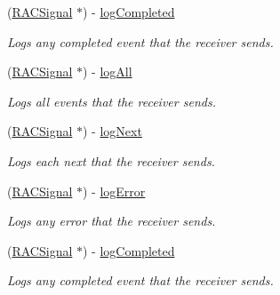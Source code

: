 \begin{DoxyCompactItemize}
(\mbox{\hyperlink{interface_r_a_c_signal}{R\+A\+C\+Signal}} $\ast$) -\/ \mbox{\hyperlink{category_r_a_c_signal_07_debugging_08_a1cacb34c4255d78ffdc38b38309112fe}{log\+Completed}}
\begin{DoxyCompactList}\small\item\em Logs any {\ttfamily completed} event that the receiver sends. \end{DoxyCompactList}\item 
\mbox{\label{category_r_a_c_signal_07_debugging_08_a8b05d15ed41ef0ad3cea3ada8eaf44b8}} 
(\mbox{\hyperlink{interface_r_a_c_signal}{R\+A\+C\+Signal}} $\ast$) -\/ \mbox{\hyperlink{category_r_a_c_signal_07_debugging_08_a8b05d15ed41ef0ad3cea3ada8eaf44b8}{log\+All}}
\begin{DoxyCompactList}\small\item\em Logs all events that the receiver sends. \end{DoxyCompactList}\item 
\mbox{\label{category_r_a_c_signal_07_debugging_08_a86ec9c26b61ad04d28734fff78d109e3}} 
(\mbox{\hyperlink{interface_r_a_c_signal}{R\+A\+C\+Signal}} $\ast$) -\/ \mbox{\hyperlink{category_r_a_c_signal_07_debugging_08_a86ec9c26b61ad04d28734fff78d109e3}{log\+Next}}
\begin{DoxyCompactList}\small\item\em Logs each {\ttfamily next} that the receiver sends. \end{DoxyCompactList}\item 
\mbox{\label{category_r_a_c_signal_07_debugging_08_a1b2a24547c2229684cab95040feafe97}} 
(\mbox{\hyperlink{interface_r_a_c_signal}{R\+A\+C\+Signal}} $\ast$) -\/ \mbox{\hyperlink{category_r_a_c_signal_07_debugging_08_a1b2a24547c2229684cab95040feafe97}{log\+Error}}
\begin{DoxyCompactList}\small\item\em Logs any error that the receiver sends. \end{DoxyCompactList}\item 
\mbox{\label{category_r_a_c_signal_07_debugging_08_a1cacb34c4255d78ffdc38b38309112fe}} 
(\mbox{\hyperlink{interface_r_a_c_signal}{R\+A\+C\+Signal}} $\ast$) -\/ \mbox{\hyperlink{category_r_a_c_signal_07_debugging_08_a1cacb34c4255d78ffdc38b38309112fe}{log\+Completed}}
\begin{DoxyCompactList}\small\item\em Logs any {\ttfamily completed} event that the receiver sends. \end{DoxyCompactList}\end{DoxyCompactItemize}



